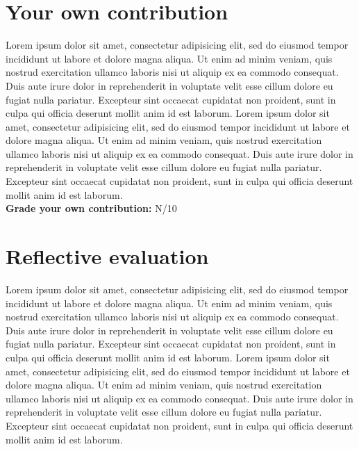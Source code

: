 \documentclass[10pt,a4paper]{article}
\begin{document}

\section*{Your own contribution}
\begin{framed}
Lorem ipsum dolor sit amet, consectetur adipisicing elit, sed do eiusmod tempor incididunt ut labore et dolore magna aliqua. Ut enim ad minim veniam, quis nostrud exercitation ullamco laboris nisi ut aliquip ex ea commodo consequat. Duis aute irure dolor in reprehenderit in voluptate velit esse cillum dolore eu fugiat nulla pariatur. Excepteur sint occaecat cupidatat non proident, sunt in culpa qui officia deserunt mollit anim id est laborum.
Lorem ipsum dolor sit amet, consectetur adipisicing elit, sed do eiusmod tempor incididunt ut labore et dolore magna aliqua. Ut enim ad minim veniam, quis nostrud exercitation ullamco laboris nisi ut aliquip ex ea commodo consequat. Duis aute irure dolor in reprehenderit in voluptate velit esse cillum dolore eu fugiat nulla pariatur. Excepteur sint occaecat cupidatat non proident, sunt in culpa qui officia deserunt mollit anim id est laborum.\\

\textbf{Grade your own contribution:} N/10
\end{framed}


\section*{Reflective evaluation}
\begin{framed}
Lorem ipsum dolor sit amet, consectetur adipisicing elit, sed do eiusmod tempor incididunt ut labore et dolore magna aliqua. Ut enim ad minim veniam, quis nostrud exercitation ullamco laboris nisi ut aliquip ex ea commodo consequat. Duis aute irure dolor in reprehenderit in voluptate velit esse cillum dolore eu fugiat nulla pariatur. Excepteur sint occaecat cupidatat non proident, sunt in culpa qui officia deserunt mollit anim id est laborum.
Lorem ipsum dolor sit amet, consectetur adipisicing elit, sed do eiusmod tempor incididunt ut labore et dolore magna aliqua. Ut enim ad minim veniam, quis nostrud exercitation ullamco laboris nisi ut aliquip ex ea commodo consequat. Duis aute irure dolor in reprehenderit in voluptate velit esse cillum dolore eu fugiat nulla pariatur. Excepteur sint occaecat cupidatat non proident, sunt in culpa qui officia deserunt mollit anim id est laborum.
\end{framed}
\end{document}
